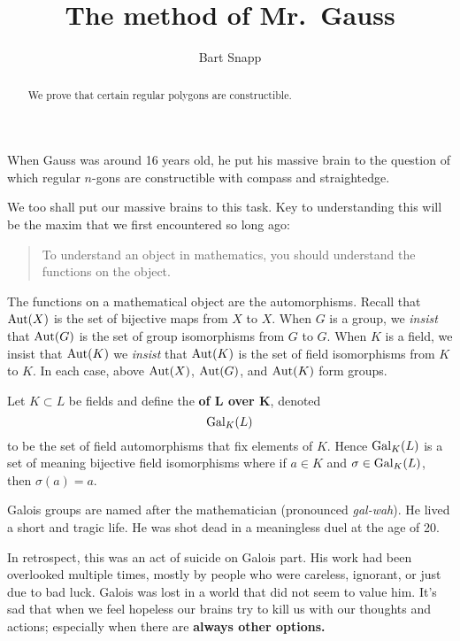 \documentclass{ximera}
\title{The method of Mr.\ Gauss}
\author{Bart Snapp}
\begin{document}
\begin{abstract}
  We prove that certain regular polygons are constructible.
\end{abstract}
\maketitle

When Gauss was around 16 years old, he put his massive brain to the
question of which regular $n$-gons are constructible with compass and
straightedge.


We too shall put our massive brains to this task. Key to understanding
this will be the maxim that we first encountered so long ago:
\begin{quote}
  To understand an object in mathematics, you should understand the
  functions on the object.
\end{quote}
The functions on a mathematical object are the automorphisms.  Recall
that $\operatorname{Aut}(X)$ is the set of bijective maps from
$X$ to $X$. When $G$ is a group, we \textit{insist} that $\operatorname{Aut}(G)$ is
the set of group isomorphisms from $G$ to $G$. When $K$ is a field, we
insist that $\operatorname{Aut}(K)$ we \textit{insist} that $\operatorname{Aut}(K)$ is the set of
field isomorphisms from $K$ to $K$. In each case, above $\operatorname{Aut}(X)$,
$\operatorname{Aut}(G)$, and $\operatorname{Aut}(K)$ form groups.



\begin{definition}
  Let $K\subset L$ be fields and define the \textbf{
    of $\boldsymbol L$ over $\boldsymbol K$}, denoted
  \[
  \operatorname{Gal}_K(L)
  \]
  to be the set of field automorphisms that fix elements of $K$. Hence
  $\operatorname{Gal}_K(L)$ is a set of meaning bijective field isomorphisms where if
  $a\in K$ and $\sigma \in \operatorname{Gal}_K(L)$, then $\sigma(a) = a$.
\end{definition}

Galois groups are named after the mathematician  (pronounced
\textit{gal-wah}). He lived a short and tragic life. He was shot dead
in a meaningless duel at the age of 20.

In retrospect, this was an act of suicide on Galois part. His work had
been overlooked multiple times, mostly by people who were careless,
ignorant, or just due to bad luck. Galois was lost in a world that did
not seem to value him.  It's sad that when we feel hopeless our brains
try to kill us with our thoughts and actions; especially when there
are \textbf{always other options.} 
\end{document}

